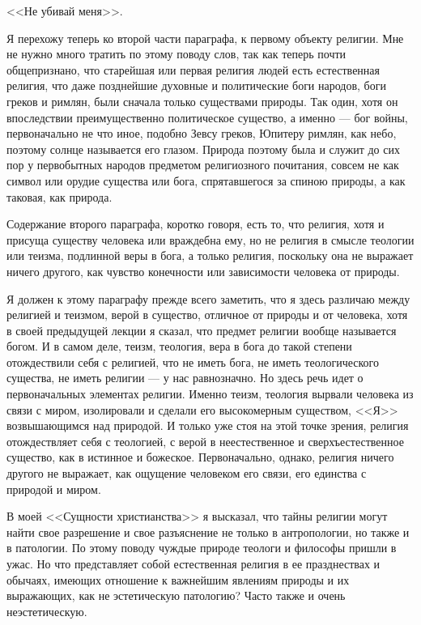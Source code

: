 \documentclass[12pt]{article}
\begin{document}
<<Не убивай меня>>. 

Я перехожу теперь ко второй части параграфа, к первому объекту религии. Мне не нужно много тратить по этому поводу слов, так как теперь почти общепризнано, что старейшая или первая религия людей есть естественная религия, что даже позднейшие духовные и политические боги народов, боги греков и римлян, были сначала только существами природы. Так один, хотя он впоследствии преимущественно политическое существо, а именно --- бог войны, первоначально не что иное, подобно Зевсу греков, Юпитеру римлян, как небо, поэтому солнце называется его глазом. Природа поэтому была и служит до сих пор у первобытных народов предметом религиозного почитания, совсем не как символ или орудие существа или бога, спрятавшегося за спиною природы, а как таковая, как природа. 

Содержание второго параграфа, коротко говоря, есть то, что религия, хотя и присуща существу человека или враждебна ему, но не религия в смысле теологии или теизма, подлинной веры в бога, а только религия, поскольку она не выражает ничего другого, как чувство конечности или зависимости человека от природы. 

Я должен к этому параграфу прежде всего заметить, что я здесь различаю между религией и теизмом, верой в существо, отличное от природы и от человека, хотя в своей предыдущей лекции я сказал, что предмет религии вообще называется богом. И в самом деле, теизм, теология, вера в бога до такой степени отождествили себя с религией, что не иметь бога, не иметь теологического существа, не иметь религии --- у нас равнозначно. Но здесь речь идет о первоначальных элементах религии. Именно теизм, теология вырвали человека из связи с миром, изолировали и сделали его высокомерным существом, <<Я>>  возвышающимся над природой. И только уже стоя на этой точке зрения, религия отождествляет себя с теологией, с верой в неестественное и сверхъестественное существо, как в истинное и божеское. Первоначально, однако, религия ничего другого не выражает, как ощущение человеком его связи, его единства с природой и миром. 

В моей <<Сущности христианства>> я высказал, что тайны религии могут найти свое разрешение и свое разъяснение не только в антропологии, но также и в патологии. По этому поводу чуждые природе теологи и философы пришли в ужас. Но что представляет собой естественная религия в ее празднествах и обычаях, имеющих отношение к важнейшим явлениям природы и их выражающих, как не эстетическую патологию? Часто также и очень неэстетическую. 
\end{document}
